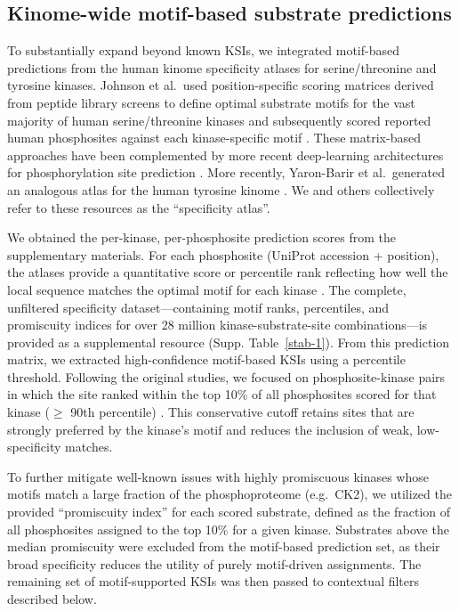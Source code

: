 \documentclass[
  number,
  preprint,
  onecolumn]{elsarticle}
\begin{document}
\subsection{Kinome-wide motif-based substrate
predictions}\label{kinome-wide-motif-based-substrate-predictions}

To substantially expand beyond known KSIs, we integrated motif-based
predictions from the human kinome specificity atlases for
serine/threonine and tyrosine kinases. Johnson et al.~used
position-specific scoring matrices derived from peptide library screens
to define optimal substrate motifs for the vast majority of human
serine/threonine kinases and subsequently scored reported human
phosphosites against each kinase-specific motif \citep{Johnson2023-ai}.
These matrix-based approaches have been complemented by more recent
deep-learning architectures for phosphorylation site prediction
\citep{Wang2020-nl}. More recently, Yaron-Barir et al.~generated an
analogous atlas for the human tyrosine kinome
\citep{Yaron-Barir2024-lv}. We and others collectively refer to these
resources as the ``specificity atlas''.

We obtained the per-kinase, per-phosphosite prediction scores from the
supplementary materials. For each phosphosite (UniProt accession +
position), the atlases provide a quantitative score or percentile rank
reflecting how well the local sequence matches the optimal motif for
each kinase \citep{Johnson2023-ai, Yaron-Barir2024-lv}. The complete,
unfiltered specificity dataset---containing motif ranks, percentiles,
and promiscuity indices for over 28 million kinase-substrate-site
combinations---is provided as a supplemental resource
(Supp. Table~\ref{stab-1}). From this prediction matrix, we extracted
high-confidence motif-based KSIs using a percentile threshold. Following
the original studies, we focused on phosphosite-kinase pairs in which
the site ranked within the top 10\% of all phosphosites scored for that
kinase (\(\ge\) 90th percentile)
\citep{Johnson2023-ai, Yaron-Barir2024-lv}. This conservative cutoff
retains sites that are strongly preferred by the kinase's motif and
reduces the inclusion of weak, low-specificity matches.

To further mitigate well-known issues with highly promiscuous kinases
whose motifs match a large fraction of the phosphoproteome (e.g.~CK2),
we utilized the provided ``promiscuity index'' for each scored
substrate, defined as the fraction of all phosphosites assigned to the
top 10\% for a given kinase. Substrates above the median promiscuity
were excluded from the motif-based prediction set, as their broad
specificity reduces the utility of purely motif-driven assignments. The
remaining set of motif-supported KSIs was then passed to contextual
filters described below.
\end{document}
